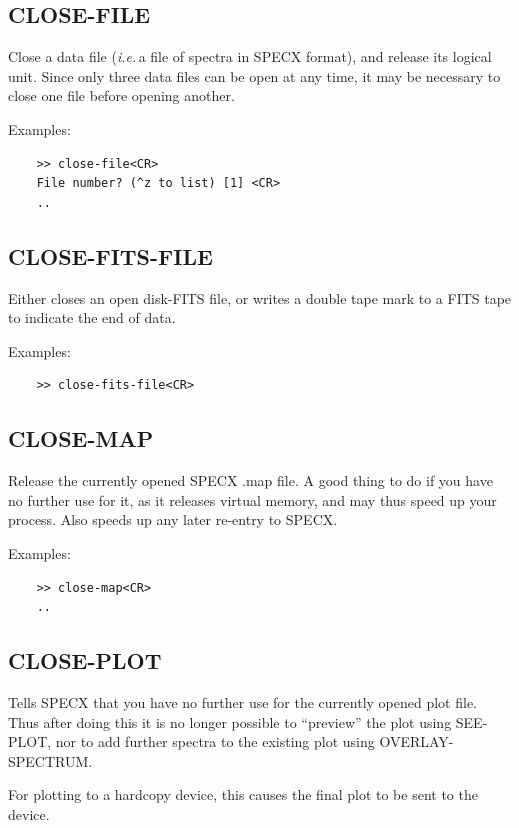 \documentclass[11pt,twoside]{report}
\newcommand{\ie}{{\it i.e.\,}}
\begin{document}
\subsection{CLOSE-FILE} 

Close a data file (\ie a file of spectra in SPECX format), and release
its logical unit. Since only three data files can be open at any time, it
may be necessary to close one file before opening another.

Examples:
\begin{verbatim}
    >> close-file<CR>
    File number? (^z to list) [1] <CR>
    ..
\end{verbatim}

\subsection{CLOSE-FITS-FILE} 

Either closes an open disk-FITS file, or writes a double tape mark
to a FITS tape to indicate the end of data.

Examples:
\begin{verbatim}
    >> close-fits-file<CR>
\end{verbatim}

\subsection{CLOSE-MAP} 

Release the currently opened SPECX .map file. A good thing to do if
you have no further use for it, as it releases virtual memory, and may thus
speed up your process. Also speeds up any later re-entry to SPECX.

Examples:
\begin{verbatim}
    >> close-map<CR>
    ..
\end{verbatim}

\subsection{CLOSE-PLOT} 

Tells SPECX that you have no further use for the currently opened plot file.
Thus after doing this it is no longer possible to ``preview'' the plot using
SEE-PLOT, nor to add further spectra to the existing plot using OVERLAY-SPECTRUM.

For plotting to a hardcopy device, this causes the final plot to be sent to
the device.
\end{document}
